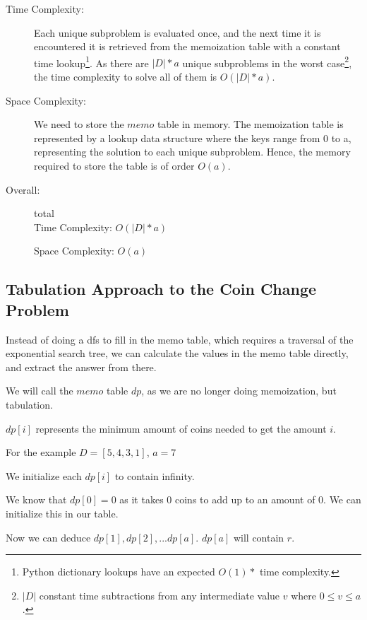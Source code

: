 \begin{description}
    \item[Time Complexity:]
        Each unique subproblem is evaluated once, and the next time it is encountered it is retrieved from the memoization table with a constant time lookup\footnote{Python dictionary lookups have an expected $O(1)*$ time complexity.}.
        As there are $|D| * a$ unique subproblems in the worst case\footnote{$|D|$ constant time subtractions from any intermediate value $v$ where $0 \leq v \leq a$.}, the time complexity to solve all of them is $O(|D| * a)$.
    
        
    \item[Space Complexity:] 
        We need to store the $memo$ table in memory.
        The memoization table is represented by a lookup data structure where the keys range from 0 to a,
        representing the solution to each unique subproblem.
        Hence, the memory required to store the table is of order $O(a)$.
        
    \item[Overall:] total\\
        Time Complexity: $O(|D| * a)$

        Space Complexity: $O(a)$
        
\end{description}

\subsection{Tabulation Approach to the Coin Change Problem}

Instead of doing a dfs to fill in the memo table, which requires a traversal of the exponential search tree, we can calculate the values in the memo table directly, and extract the answer from there.

We will call the $memo$ table $dp$, as we are no longer doing memoization, but tabulation.

$dp[i]$ represents the minimum amount of coins needed to get the amount $i$.

For the example $D = [5,4,3,1]$, $a = 7$

We initialize each $dp[i]$ to contain infinity.

We know that $dp[0] = 0$ as it takes $0$ coins to add up to an amount of $0$. We can initialize this in our table.

Now we can deduce $dp[1], dp[2], ... dp[a]$. $dp[a]$ will contain $r$.

